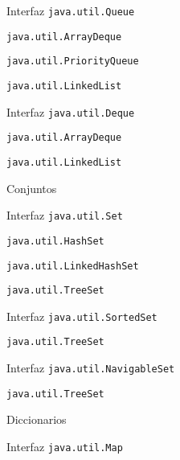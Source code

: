 \begin{longenum}
\begin{longenum}
\begin{longenum}
            \item Interfaz \texttt{java.util.Queue}
            \begin{longenum}
                \item \texttt{java.util.ArrayDeque}
                \item \texttt{java.util.PriorityQueue}
                \item \texttt{java.util.LinkedList}
            \end{longenum}
            \item Interfaz \texttt{java.util.Deque}
            \begin{longenum}
                \item \texttt{java.util.ArrayDeque}
                \item \texttt{java.util.LinkedList}
            \end{longenum}
        \end{longenum}
        \item Conjuntos
        \begin{longenum}
            \item Interfaz \texttt{java.util.Set}
            \begin{longenum}
                \item \texttt{java.util.HashSet}
                \item \texttt{java.util.LinkedHashSet}
                \item \texttt{java.util.TreeSet}
            \end{longenum}
            \item Interfaz \texttt{java.util.SortedSet}
            \begin{longenum}
                \item \texttt{java.util.TreeSet}
            \end{longenum}
            \item Interfaz \texttt{java.util.NavigableSet}
            \begin{longenum}
                \item \texttt{java.util.TreeSet}
            \end{longenum}
        \end{longenum}
        \item Diccionarios
        \begin{longenum}
            \item Interfaz \texttt{java.util.Map}
            \begin{longenum}

\end{longenum}
\end{longenum}
\end{longenum}
\end{longenum}
